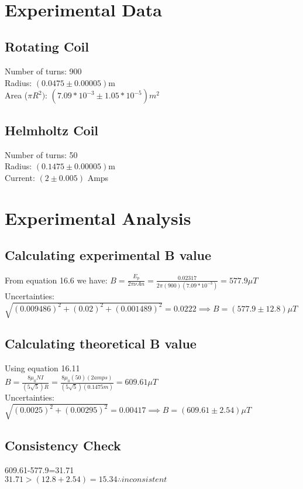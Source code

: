 \documentclass{article}
\begin{document}
\ 
\ 
\section{Experimental Data}
\subsection{Rotating Coil}
Number of turns: 900\\
Radius: $(0.0475\pm0.00005)$m\\
Area ($\pi R^2)$: $(7.09*10^{-3}\pm1.05*10^{-5}) m^2$
\subsection{Helmholtz Coil}
Number of turns: 50\\
Radius: $(0.1475\pm0.00005)$m\\
Current: $(2\pm0.005)$ Amps\\
\section{Experimental Analysis}
\subsection{Calculating experimental B value}
From equation 16.6 we have:
$B=\frac{E_p}{2\pi\nu An}=\frac{0.02317}{2\pi(900)(7.09*10^{-3})}= 577.9\mu T$\\

Uncertainties:\\
$\sqrt{(0.009486)^2+(0.02)^2+(0.001489)^2}=0.0222 \implies B=(577.9\pm12.8)\mu T$
\subsection{Calculating theoretical B value}
Using equation 16.11\\
$B=\frac{8\mu_0 NI}{(5\sqrt{5})R}=\frac{8\mu_0(50)(2amps)}{(5\sqrt{5})(0.1475m)}=609.61\mu T$\\

Uncertainties:\\
$\sqrt{(0.0025)^2+(0.00295)^2}=0.00417 \implies B=(609.61\pm2.54)\mu T$
\subsection{Consistency Check}
609.61-577.9=31.71\\
$31.71 >(12.8+2.54)=15.34 \therefore inconsistent$
\end{document}
